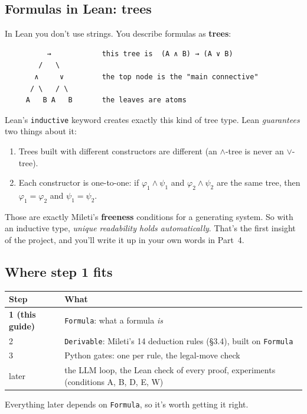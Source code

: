 \documentclass[11pt,a4paper]{article}
\newcommand{\code}[1]{\texttt{#1}}
\begin{document}
\subsection{Formulas in Lean: trees}
In Lean you don't use strings. You describe formulas as \textbf{trees}:
\begin{center}
\begin{BVerbatim}
          →            this tree is  (A ∧ B) → (A ∨ B)
        /   \
       ∧     ∨         the top node is the "main connective"
      / \   / \
     A   B A   B       the leaves are atoms
\end{BVerbatim}
\end{center}
Lean's \code{inductive} keyword creates exactly this kind of tree type. Lean \emph{guarantees} two things about it:
\begin{enumerate}
\item Trees built with different constructors are different (an $\wedge$-tree is never an $\vee$-tree).
\item Each constructor is one-to-one: if $\varphi_1\wedge\psi_1$ and $\varphi_2\wedge\psi_2$ are the same tree, then $\varphi_1=\varphi_2$ and $\psi_1=\psi_2$.
\end{enumerate}
Those are exactly Mileti's \textbf{freeness} conditions for a generating system. So with an inductive type, \emph{unique readability holds automatically}. That's the first insight of the project, and you'll write it up in your own words in Part~4.

\subsection{Where step 1 fits}
\begin{center}
\begin{tabularx}{\linewidth}{@{}l>{\raggedright\arraybackslash}X@{}}
\toprule
\textbf{Step} & \textbf{What}\\
\midrule
\textbf{1 (this guide)} & \code{Formula}: what a formula \emph{is}\\
2 & \code{Derivable}: Mileti's 14 deduction rules (§3.4), built on \code{Formula}\\
3 & Python gates: one per rule, the legal-move check\\
later & the LLM loop, the Lean check of every proof, experiments (conditions A, B, D, E, W)\\
\bottomrule
\end{tabularx}
\end{center}
Everything later depends on \code{Formula}, so it's worth getting it right.
\end{document}
